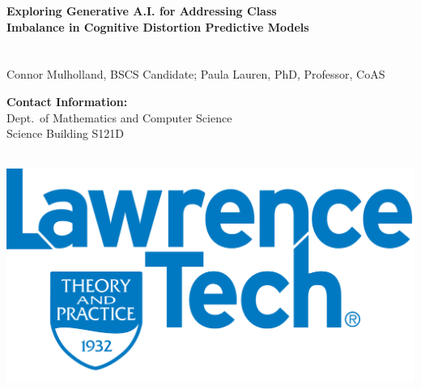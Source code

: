 \documentclass[a0,landscape]{a0poster}
\begin{document}
\begin{minipage}[b]{0.55\linewidth}
\veryHuge \color{DarkOrange} \textbf{Exploring Generative A.I. for Addressing Class \\ Imbalance in Cognitive Distortion Predictive Models} 
\\
\color{Black}\\ %
\huge\\Connor Mulholland, BSCS Candidate; Paula Lauren, PhD, Professor, CoAS %

\end{minipage}
%
\begin{minipage}[b]{0.25\linewidth}
\color{DarkSlateGray}\Large \textbf{Contact Information:}\\
Dept.\ of Mathematics and Computer Science\\ %
Science Building S121D\\
\\

\end{minipage}
%
\begin{minipage}[b]{0.18\linewidth}
\includegraphics[width=20cm]{LTU2.png} %
\end{minipage}

\vspace{1cm} %

\end{document}
